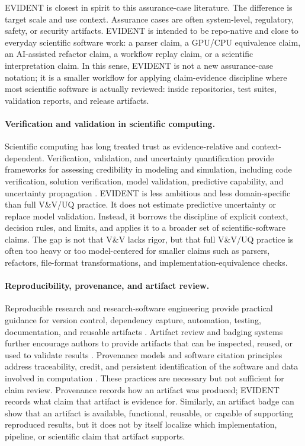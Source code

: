 \documentclass[10pt,twoside]{article}
\begin{document}
EVIDENT is closest in spirit to this assurance-case literature. The difference
is target scale and use context. Assurance cases are often system-level,
regulatory, safety, or security artifacts. EVIDENT is intended to be
repo-native and close to everyday scientific software work: a parser claim, a
GPU/CPU equivalence claim, an AI-assisted refactor claim, a workflow replay
claim, or a scientific interpretation claim. In this sense, EVIDENT is not a
new assurance-case notation; it is a smaller workflow for applying
claim-evidence discipline where most scientific software is actually reviewed:
inside repositories, test suites, validation reports, and release artifacts.

\paragraph{Verification and validation in scientific computing.}
Scientific computing has long treated trust as evidence-relative and
context-dependent. Verification, validation, and uncertainty quantification
provide frameworks for assessing credibility in modeling and simulation,
including code verification, solution verification, model validation, predictive
capability, and uncertainty propagation
\citep{oberkampf2002verification,roy2011comprehensive}. EVIDENT is less
ambitious and less domain-specific than full V\&V/UQ practice. It does not
estimate predictive uncertainty or replace model validation. Instead, it
borrows the discipline of explicit context, decision rules, and limits, and
applies it to a broader set of scientific-software claims.
The gap is not that V\&V lacks rigor, but that full V\&V/UQ practice is often
too heavy or too model-centered for smaller claims such as parsers, refactors,
file-format transformations, and implementation-equivalence checks.

\paragraph{Reproducibility, provenance, and artifact review.}
Reproducible research and research-software engineering provide practical
guidance for version control, dependency capture, automation, testing,
documentation, and reusable artifacts
\citep{sandve2013ten,wilson2014best}. Artifact review and badging systems
further encourage authors to provide artifacts that can be inspected, reused,
or used to validate results \citep{acm_artifact_badging}. Provenance models
and software citation principles address traceability, credit, and persistent
identification of the software and data involved in computation
\citep{w3c_prov_dm,smith2016software,barker2022fair}. These practices are
necessary but not sufficient for claim review. Provenance records how an
artifact was produced; EVIDENT records what claim that artifact is evidence
for. Similarly, an artifact badge can show that an artifact is available,
functional, reusable, or capable of supporting reproduced results, but it does
not by itself localize which implementation, pipeline, or scientific claim that
artifact supports.
\end{document}
